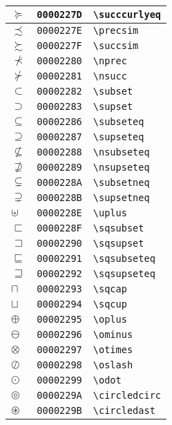 \begin{longtable}{|l|l|l|}
$\succcurlyeq$ & \texttt{0000227D} & \verb|\succcurlyeq| \\
\hline
$\precsim$ & \texttt{0000227E} & \verb|\precsim| \\
\hline
$\succsim$ & \texttt{0000227F} & \verb|\succsim| \\
\hline
$\nprec$ & \texttt{00002280} & \verb|\nprec| \\
\hline
$\nsucc$ & \texttt{00002281} & \verb|\nsucc| \\
\hline
$\subset$ & \texttt{00002282} & \verb|\subset| \\
\hline
$\supset$ & \texttt{00002283} & \verb|\supset| \\
\hline
$\subseteq$ & \texttt{00002286} & \verb|\subseteq| \\
\hline
$\supseteq$ & \texttt{00002287} & \verb|\supseteq| \\
\hline
$\nsubseteq$ & \texttt{00002288} & \verb|\nsubseteq| \\
\hline
$\nsupseteq$ & \texttt{00002289} & \verb|\nsupseteq| \\
\hline
$\subsetneq$ & \texttt{0000228A} & \verb|\subsetneq| \\
\hline
$\supsetneq$ & \texttt{0000228B} & \verb|\supsetneq| \\
\hline
$\uplus$ & \texttt{0000228E} & \verb|\uplus| \\
\hline
$\sqsubset$ & \texttt{0000228F} & \verb|\sqsubset| \\
\hline
$\sqsupset$ & \texttt{00002290} & \verb|\sqsupset| \\
\hline
$\sqsubseteq$ & \texttt{00002291} & \verb|\sqsubseteq| \\
\hline
$\sqsupseteq$ & \texttt{00002292} & \verb|\sqsupseteq| \\
\hline
$\sqcap$ & \texttt{00002293} & \verb|\sqcap| \\
\hline
$\sqcup$ & \texttt{00002294} & \verb|\sqcup| \\
\hline
$\oplus$ & \texttt{00002295} & \verb|\oplus| \\
\hline
$\ominus$ & \texttt{00002296} & \verb|\ominus| \\
\hline
$\otimes$ & \texttt{00002297} & \verb|\otimes| \\
\hline
$\oslash$ & \texttt{00002298} & \verb|\oslash| \\
\hline
$\odot$ & \texttt{00002299} & \verb|\odot| \\
\hline
$\circledcirc$ & \texttt{0000229A} & \verb|\circledcirc| \\
\hline
$\circledast$ & \texttt{0000229B} & \verb|\circledast| \\

\end{longtable}
